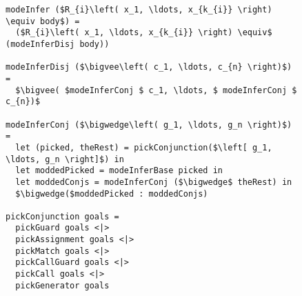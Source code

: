 


\begin{figure}[h]
  \centering
  \begin{minipage}{\columnwidth}
    \begin{lstlisting}[label={fig:modeInference},
                       caption={Mode inference pseudocode},
                       captionpos=b,
                       frame=tb]
modeInfer ($R_{i}\left( x_1, \ldots, x_{k_{i}} \right) \equiv body$) =
  ($R_{i}\left( x_1, \ldots, x_{k_{i}} \right) \equiv$ (modeInferDisj body))

modeInferDisj ($\bigvee\left( c_1, \ldots, c_{n} \right)$) =
  $\bigvee( $modeInferConj $ c_1, \ldots, $ modeInferConj $ c_{n})$

modeInferConj ($\bigwedge\left( g_1, \ldots, g_n \right)$) =
  let (picked, theRest) = pickConjunction($\left[ g_1, \ldots, g_n \right]$) in
  let moddedPicked = modeInferBase picked in
  let moddedConjs = modeInferConj ($\bigwedge$ theRest) in
  $\bigwedge($moddedPicked : moddedConjs)

pickConjunction goals =
  pickGuard goals <|>
  pickAssignment goals <|>
  pickMatch goals <|>
  pickCallGuard goals <|>
  pickCall goals <|>
  pickGenerator goals
    \end{lstlisting}
  \end{minipage}
\end{figure}